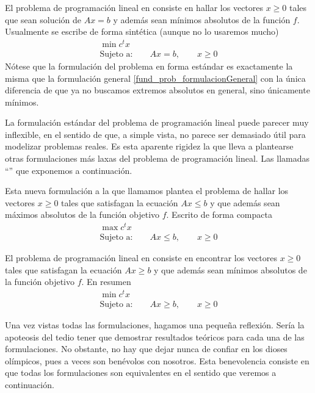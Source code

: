 \begin{prob}
El problema de programación lineal en  consiste en hallar los vectores $x\geq 0$ tales que sean solución de $Ax=b$ y además sean mínimos absolutos de la función $f$. Usualmente se escribe de forma sintética (aunque no lo usaremos mucho)
\begin{equation*}
\begin{array}{c}
\min c^tx\\
\text{Sujeto a:}\qquad Ax=b,\qquad x\geq 0
\end{array}
\end{equation*}
Nótese que la formulación del problema en forma estándar es exactamente la misma que la formulación general \ref{fund_prob_formulacionGeneral} con la única diferencia de que ya no buscamos extremos absolutos en general, sino únicamente mínimos. 
\end{prob}
La formulación estándar del problema de programación lineal puede parecer muy inflexible, en el sentido de que, a simple vista, no parece ser demasiado útil para modelizar problemas reales. Es esta aparente rigidez la que lleva a plantearse otras formulaciones más laxas del problema de programación lineal. Las llamadas ``'' que exponemos a continuación.
\begin{prob}
	Esta nueva formulación a la que llamamos  plantea el problema de hallar los vectores $x\geq 0$ tales que satisfagan la ecuación $Ax\leq b$ y que además sean máximos absolutos de la función objetivo $f$. Escrito de forma compacta
	\begin{equation*}
	\begin{array}{c}
	\max c^tx\\
	\text{Sujeto a:}\qquad Ax\leq b,\qquad x\geq 0
	\end{array}
	\end{equation*}
\end{prob}
\begin{prob}
	El problema de programación lineal en  consiste en encontrar los vectores $x\geq 0$ tales que satisfagan la ecuación $Ax\geq b$ y que además sean mínimos absolutos de la función objetivo $f$. En resumen
	\begin{equation*}
	\begin{array}{c}
	\min c^tx\\
	\text{Sujeto a:}\qquad Ax\geq b,\qquad x\geq 0
	\end{array}
	\end{equation*}
\end{prob}
Una vez vistas todas las formulaciones, hagamos una pequeña reflexión. Sería la apoteosis del tedio tener que demostrar resultados teóricos para cada una de las formulaciones. No obstante, no hay que dejar nunca de confiar en los dioses olímpicos, pues a veces son benévolos con nosotros. Esta benevolencia consiste en que todas los formulaciones son equivalentes en el sentido que veremos a continuación.
